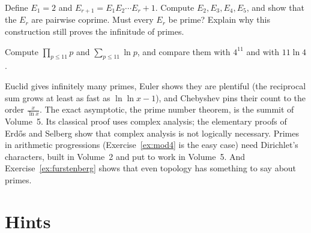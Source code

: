\begin{exercise}[$\star\star$]\label{ex:t1-euclid-sequence}
Define $E_1=2$ and $E_{r+1}=E_1E_2\cdots E_r+1$. Compute $E_2,E_3,E_4,E_5$, and show that the $E_r$ are pairwise coprime. Must every $E_r$ be prime? Explain why this construction still proves the infinitude of primes.
\end{exercise}

\begin{exercise}[$\star$]\label{ex:t1-prod11}
Compute $\prod_{p\le 11}p$ and $\sum_{p\le 11}\ln p$, and compare them with $4^{11}$ and with $11\ln 4$.
\end{exercise}

\begin{beauty}
Euclid gives infinitely many primes, Euler shows they are plentiful (the reciprocal sum grows at least as fast as $\ln\ln x-1$), and Chebyshev pins their count to the order $\frac x{\ln x}$. The exact asymptotic, the prime number theorem, is the summit of Volume~5. Its classical proof uses complex analysis; the elementary proofs of Erd\H{o}s and Selberg show that complex analysis is not logically necessary. Primes in arithmetic progressions (Exercise~\ref{ex:mod4} is the easy case) need Dirichlet's characters, built in Volume~2 and put to work in Volume~5. And Exercise~\ref{ex:furstenberg} shows that even topology has something to say about primes.
\end{beauty}

\section{Hints}

